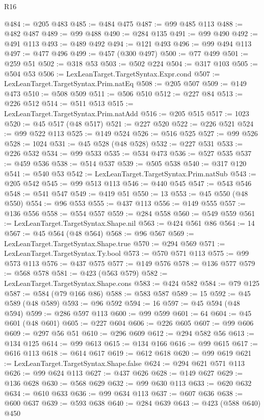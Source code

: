\begin{lexlean}{R16}
\begin{coremodule}
@484 := @205 @483
@485 := @484 @475
@487 := @99 @485 @113
@488 := @482 @487
@489 := @99 @488
@490 := @284 @135
@491 := @99 @490
@492 := @491 @113
@493 := @489 @492
@494 := @121 @493
@496 := @99 @494 @113
@497 := @477 @496
@499 := @457 (@300 @497)
@500 := @77 @499
@501 := @259 @51
@502 := @318 @53
@503 := @502 @224
@504 := @317 @103
@505 := @504 @53
@506 := LexLeanTarget.TargetSyntax.Expr.cond
@507 := LexLeanTarget.TargetSyntax.Prim.natEq
@508 := @205 @507
@509 := @149 @473
@510 := @508 @509
@511 := @506 @510
@512 := @227 @84
@513 := @226 @512
@514 := @511 @513
@515 := LexLeanTarget.TargetSyntax.Prim.natAdd
@516 := @205 @515
@517 := 1023
@520 := @45 @517 (@48 @517)
@521 := @227 @520
@522 := @226 @521
@524 := @99 @522 @113
@525 := @149 @524
@526 := @516 @525
@527 := @99 @526
@528 := 1024
@531 := @45 @528 (@48 @528)
@532 := @227 @531
@533 := @226 @532
@534 := @99 @533
@535 := @534 @473
@536 := @527 @535
@537 := @459 @536
@538 := @514 @537
@539 := @505 @538
@540 := @317 @120
@541 := @540 @53
@542 := LexLeanTarget.TargetSyntax.Prim.natSub
@543 := @205 @542
@545 := @99 @513 @113
@546 := @440 @545
@547 := @543 @546
@548 := @541 @547
@549 := @419 @51
@550 := 13
@553 := @45 @550 (@48 @550)
@554 := @96 @553
@555 := @437 @113
@556 := @149 @555
@557 := @136 @556
@558 := @554 @557
@559 := @284 @558
@560 := @549 @559
@561 := LexLeanTarget.TargetSyntax.Shape.nil
@563 := @424 @561 @86
@564 := 14
@567 := @45 @564 (@48 @564)
@568 := @96 @567
@569 := LexLeanTarget.TargetSyntax.Shape.true
@570 := @294 @569
@571 := LexLeanTarget.TargetSyntax.Ty.bool
@573 := @570 @571 @113
@575 := @99 @573 @113
@576 := @437 @575
@577 := @149 @576
@578 := @136 @577
@579 := @568 @578
@581 := @423 (@563 @579)
@582 := LexLeanTarget.TargetSyntax.Shape.cons
@583 := @424 @582
@584 := @79 @125
@587 := @584 (@79 @166 @86)
@588 := @583 @587
@589 := 15
@592 := @45 @589 (@48 @589)
@593 := @96 @592
@594 := 16
@597 := @45 @594 (@48 @594)
@599 := @286 @597 @113
@600 := @99 @599
@601 := 64
@604 := @45 @601 (@48 @601)
@605 := @227 @604
@606 := @226 @605
@607 := @99 @606
@609 := @297 @56 @51
@610 := @296 @609
@612 := @294 @582 @56
@613 := @134 @125
@614 := @99 @613
@615 := @134 @166
@616 := @99 @615
@617 := @616 @113
@618 := @614 @617
@619 := @612 @618
@620 := @99 @619
@621 := LexLeanTarget.TargetSyntax.Shape.false
@624 := @294 @621 @571 @113
@626 := @99 @624 @113
@627 := @437 @626
@628 := @149 @627
@629 := @136 @628
@630 := @568 @629
@632 := @99 @630 @113
@633 := @620 @632
@634 := @610 @633
@636 := @99 @634 @113
@637 := @607 @636
@638 := @600 @637
@639 := @593 @638
@640 := @284 @639
@643 := @423 (@588 @640) @450

\end{coremodule}
\end{lexlean}
